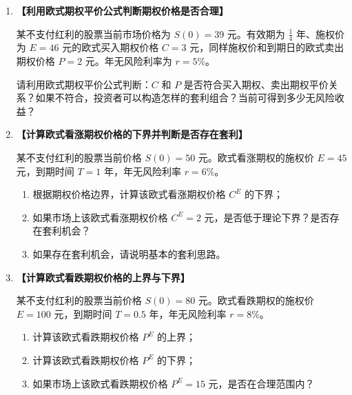 \documentclass[10pt]{article}
\begin{document}
\begin{enumerate}[label=\textbf{\arabic*.}]

\item  {\bf{【利用欧式期权平价公式判断期权价格是否合理】}} %

某不支付红利的股票当前市场价格为 \(S(0) = 39\) 元。有效期为 \(\frac{1}{4}\) 年、施权价为 \(E = 46\) 元的欧式买入期权价格 \(C = 3\) 元，同样施权价和到期日的欧式卖出期权价格 \(P = 2\) 元。年无风险利率为 \(r = 5\%\)。

请利用欧式期权平价公式判断：\(C\) 和 \(P\) 是否符合买入期权、卖出期权平价关系？如果不符合，投资者可以构造怎样的套利组合？当前可得到多少无风险收益？

\vspace{0cm}

\item  {\bf{【计算欧式看涨期权价格的下界并判断是否存在套利】}} %

某不支付红利的股票当前价格 \(S(0) = 50\) 元。欧式看涨期权的施权价 \(E = 45\) 元，到期时间 \(T = 1\) 年，年无风险利率 \(r = 6\%\)。

\begin{enumerate}[label=(\arabic*)]
    \item 根据期权价格边界，计算该欧式看涨期权价格 \(C^E\) 的下界；
    \item 如果市场上该欧式看涨期权价格 \(C^E = 2\) 元，是否低于理论下界？是否存在套利机会？
    \item 如果存在套利机会，请说明基本的套利思路。
\end{enumerate}

\vspace{0cm}

\item  {\bf{【计算欧式看跌期权价格的上界与下界】}} %

某不支付红利的股票当前价格 \(S(0) = 80\) 元。欧式看跌期权的施权价 \(E = 100\) 元，到期时间 \(T = 0.5\) 年，年无风险利率 \(r = 8\%\)。

\begin{enumerate}[label=(\arabic*)]
    \item 计算该欧式看跌期权价格 \(P^E\) 的上界；
    \item 计算该欧式看跌期权价格 \(P^E\) 的下界；
    \item 如果市场上该欧式看跌期权价格 \(P^E = 15\) 元，是否在合理范围内？
\end{enumerate}


\end{enumerate}
\end{document}
